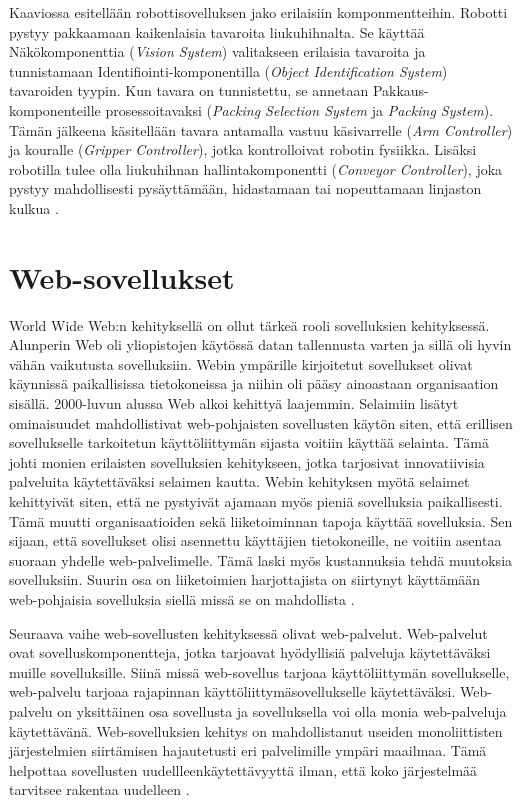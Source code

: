 \documentclass[utf8]{gradu3}
\begin{document}
Kaaviossa esitellään robottisovelluksen jako erilaisiin komponmentteihin. Robotti pystyy pakkaamaan kaikenlaisia tavaroita liukuhihnalta. Se käyttää Näkökomponenttia (\emph{Vision System}) valitakseen erilaisia tavaroita ja tunnistamaan Identifiointi-komponentilla (\emph{Object Identification System}) tavaroiden tyypin. Kun tavara on tunnistettu, se annetaan Pakkaus-komponenteille prosessoitavaksi (\emph{Packing Selection System} ja \emph{Packing System}). Tämän jälkeena käsitellään tavara antamalla vastuu käsivarrelle (\emph{Arm Controller}) ja kouralle (\emph{Gripper Controller}), jotka kontrolloivat robotin fysiikka. Lisäksi robotilla tulee olla liukuhihnan hallintakomponentti (\emph{Conveyor Controller}), joka pystyy mahdollisesti pysäyttämään, hidastamaan tai nopeuttamaan linjaston kulkua \parencite[s.148]{Sommerville}.

\section{Web-sovellukset}
World Wide Web:n kehityksellä on ollut tärkeä rooli sovelluksien kehityksessä. Alunperin Web oli yliopistojen käytössä datan tallennusta varten ja sillä oli hyvin vähän vaikutusta sovelluksiin. Webin ympärille kirjoitetut sovellukset olivat käynnissä paikallisissa tietokoneissa ja niihin oli pääsy ainoastaan organisaation sisällä. 2000-luvun alussa Web alkoi kehittyä laajemmin. Selaimiin lisätyt ominaisuudet mahdollistivat web-pohjaisten sovellusten käytön siten, että erillisen sovellukselle tarkoitetun käyttöliittymän sijasta voitiin käyttää selainta. Tämä johti monien erilaisten sovelluksien kehitykseen, jotka tarjosivat innovatiivisia palveluita käytettäväksi selaimen kautta. Webin kehityksen myötä selaimet kehittyivät siten, että ne pystyivät ajamaan myös pieniä sovelluksia paikallisesti. Tämä muutti organisaatioiden sekä liiketoiminnan tapoja käyttää sovelluksia. Sen sijaan, että sovellukset olisi asennettu käyttäjien tietokoneille, ne voitiin asentaa suoraan yhdelle web-palvelimelle. Tämä laski myös kustannuksia tehdä muutoksia sovelluksiin. Suurin osa on liiketoimien harjottajista on siirtynyt käyttämään web-pohjaisia sovelluksia siellä missä se on mahdollista \parencite[s.13]{Sommerville}.

Seuraava vaihe web-sovellusten kehityksessä olivat web-palvelut. Web-palvelut ovat sovelluskomponentteja, jotka tarjoavat hyödyllisiä palveluja käytettäväksi muille sovelluksille. Siinä missä web-sovellus tarjoaa käyttöliittymän sovellukselle, web-palvelu tarjoaa rajapinnan käyttöliittymäsovellukselle käytettäväksi. Web-palvelu on yksittäinen osa sovellusta ja sovelluksella voi olla monia web-palveluja käytettävänä. Web-sovelluksien kehitys on mahdollistanut useiden monoliittisten järjestelmien siirtämisen hajautetusti eri palvelimille ympäri maailmaa. Tämä helpottaa sovellusten uudellleenkäytettävyyttä ilman, että koko järjestelmää tarvitsee rakentaa uudelleen \parencite[s.13]{Sommerville}. 
\end{document}
